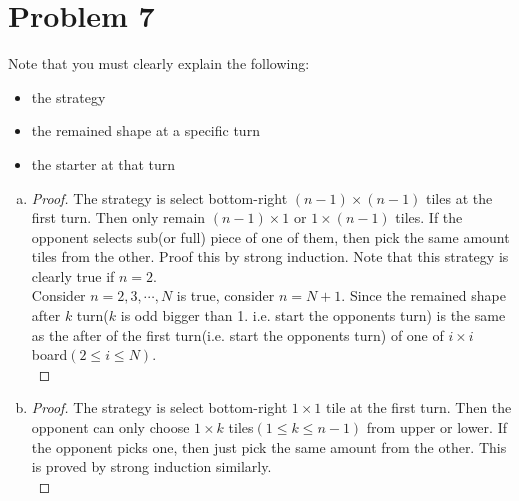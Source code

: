 \section*{Problem 7}
	Note that you must clearly explain the following:
	\begin{itemize}
		\item the strategy
		\item the remained shape at a specific turn
		\item the starter at that turn
	\end{itemize}
\begin{enumerate} [(a)]
	\item 
		\begin{proof}
			The strategy is select bottom-right $(n-1)\times(n-1)$ tiles at the first turn. Then only remain $(n-1)\times1$ or $1\times(n-1)$ tiles. If the opponent selects sub(or full) piece of one of them, then pick the same amount tiles from the other. Proof this by strong induction. Note that this strategy is clearly true if $n = 2$.\\
			Consider $n = 2, 3, \cdots, N$ is true, consider $n = N + 1$. Since the remained shape after $k$ turn($k$ is odd bigger than 1. i.e. start the opponent\textquotesingle s turn) is the same as the after of the first turn(i.e. start the opponent\textquotesingle s turn) of one of $i\times i$ board$(2 \leq i \leq N)$.\\
		\end{proof}
	\item 
		\begin{proof}
			The strategy is select bottom-right $1\times1$ tile at the first turn. Then the opponent can only choose $1\times k$ tiles$(1 \leq k \leq n - 1)$ from upper or lower. If the opponent picks one, then just pick the same amount from the other. This is proved by strong induction similarly.\\
		\end{proof}
\end{enumerate}